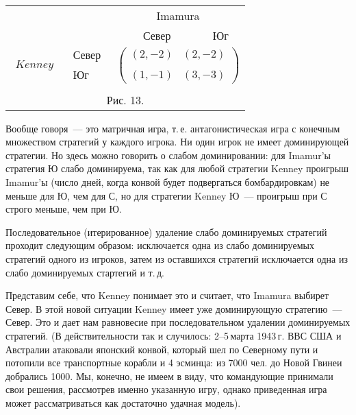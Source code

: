 \begin{center}
\begin{tabular}{cccc}
&&\multicolumn{2}{c}{Imamura}\\
&&\quad\,\, Север& Юг\\
$\begin{array}{c} \\Kenney\\ \end{array}$& $\begin{array}{c} Север\\ \\
Юг \end{array}$& \multicolumn{2}{c}{$\left( \begin{array}{cc}
(2,-2)&(2,-2)\\
\\
(1,-1)&(3,-3)\end{array}\right)$}\\
\multicolumn{4}{c}{}\\
\multicolumn{4}{c}{Рис. 13.}\\
\end{tabular}
\end{center}

Вообще говоря~--- это матричная игра, т.\,е. антагонистическая игра
с конечным множеством стратегий у каждого игрока.  Ни один игрок не
имеет доминирующей стратегии. Но здесь можно говорить о слабом
доминировании: для Imamur'ы стратегия Ю слабо доминируема, так как
для любой стратегии Kenney проигрыш Imamur'ы (число дней, когда
конвой будет подвергаться бомбардировкам) не меньше для Ю, чем для
С, но для стратегии Kenney Ю~--- проигрыш при С строго меньше, чем
при Ю.


Последовательное (итерированное) удаление слабо доминируемых
стратегий проходит следующим образом: исключается одна из слабо
доминируемых стратегий одного из игроков, затем из оставшихся
стратегий исключается одна из слабо доминируемых стартегий и т.\,д.

Представим себе, что Kenney понимает это и считает, что Imamura
выбирет Север.  В этой новой ситуации Kenney имеет уже
доминирующую стратегию~--- Север. Это и дает нам равновесие при
последовательном удалении доминируемых стратегий. (В
действительности так и случилось: 2--5\,марта 1943\,г. ВВС США и
Австралии атаковали японский конвой, который шел по Северному пути
и потопили все транспортные корабли и 4 эсминца: из 7000 чел. до
Новой Гвинеи добрались 1000. Мы, конечно, не имеем в виду, что
командующие принимали свои решения, рассмотрев именно указанную
игру, однако приведенная игра может рассматриваться как достаточно
удачная модель).

